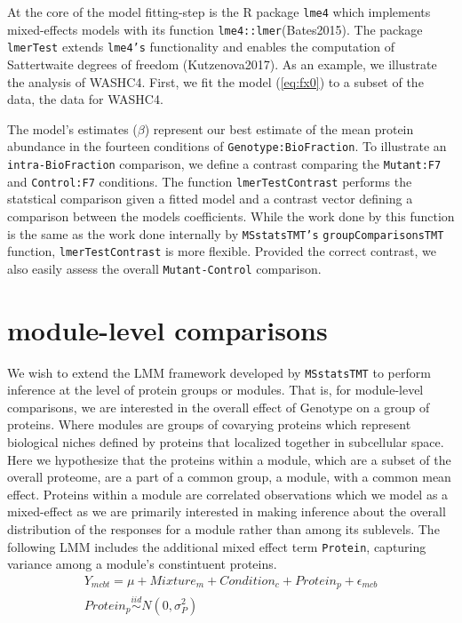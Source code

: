\documentclass[11pt]{elife}\usepackage[]{graphicx}\usepackage[]{color}
\begin{document}
At the core of the model fitting-step is the R package \texttt{lme4} which
implements mixed-effects models with its function \texttt{lme4::lmer}(Bates2015). The
package \texttt{lmerTest} extends \texttt{lme4's} functionality and enables the
computation of Sattertwaite degrees of freedom (Kutzenova2017). As an example,
we illustrate the analysis of WASHC4. First, we fit the model (\ref{eq:fx0}) to
a subset of the data, the data for WASHC4.

The model's estimates ($\beta$) represent our best estimate of the mean protein
abundance in the fourteen conditions of \texttt{Genotype:BioFraction}. 
To illustrate an \texttt{intra-BioFraction} comparison, we 
define a contrast comparing the \texttt{Mutant:F7} and \texttt{Control:F7}
conditions. The function \texttt{lmerTestContrast} performs the statstical comparison given
a fitted model and a contrast vector defining a comparison between the models
coefficients. While the work done by this function 
is the same as the work done internally by \texttt{MSstatsTMT's}
\texttt{groupComparisonsTMT} function, \texttt{lmerTestContrast} is more
flexible. Provided the correct contrast, we also easily assess the overall
\texttt{Mutant-Control} comparison.\\


\section{module-level comparisons}

We wish to extend the LMM framework developed by \texttt{MSstatsTMT} to perform 
inference at the level of protein groups or modules.
That is, for module-level comparisons, we are interested in the overall effect 
of Genotype on a group of proteins. Where modules are groups of covarying 
proteins which represent biological niches defined by proteins that 
localized together in subcellular space.\\

Here we hypothesize that the proteins within a module, which are a subset of the
overall proteome,  are a part of a common group, a module, with a common mean
effect. Proteins within a module are correlated observations which we model as a
mixed-effect as we are primarily interested in making inference about the
overall distribution of the responses for a module rather than among its
sublevels. The following LMM includes the additional mixed effect term
\texttt{Protein}, capturing variance among a module's constintuent proteins.
\begin{equation} 
  \begin{gathered}\label{eq:fx1} %
	Y_{mcbt} = \mu + Mixture_m + Condition_c + Protein_p + \epsilon_{mcb}\\
	Protein_p \stackrel{iid}{\sim} N(0,\sigma^2_P) \\
  \end{gathered}
\end{equation}
\end{document}
